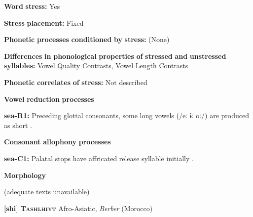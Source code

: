 \documentclass[output=paper]{langsci/langscibook}
\begin{document}
\begin{styleBody}
\textbf{Word} \textbf{stress:} Yes
\end{styleBody}

\begin{styleBody}
\textbf{Stress} \textbf{placement:} Fixed
\end{styleBody}

\begin{styleBody}
\textbf{Phonetic} \textbf{processes} \textbf{conditioned} \textbf{by} \textbf{stress:} (None)
\end{styleBody}

\begin{styleBody}
\textbf{Differences} \textbf{in} \textbf{phonological} \textbf{properties} \textbf{of} \textbf{stressed} \textbf{and} \textbf{unstressed} \textbf{syllables:} Vowel Quality Contrasts, Vowel Length Contrasts
\end{styleBody}

\begin{styleBody}
\textbf{Phonetic} \textbf{correlates} \textbf{of} \textbf{stress:} Not described
\end{styleBody}

\begin{styleBody}
\textbf{Vowel} \textbf{reduction} \textbf{processes}
\end{styleBody}

\begin{styleBody}
\textbf{sea-R1:} Preceding glottal consonants, some long vowels (/eː ɨː oː/) are produced as short \citep[10-11]{Philips2007}.
\end{styleBody}

\begin{styleBody}
\textbf{Consonant} \textbf{allophony} \textbf{processes}
\end{styleBody}

\begin{styleBody}
\textbf{sea-C1:} Palatal stops have affricated release syllable initially \citep[5]{Philips2007}.
\end{styleBody}

\begin{styleBody}
\textbf{Morphology}
\end{styleBody}

\begin{styleBody}
(adequate texts unavailable)
\end{styleBody}

\begin{styleBody}
\textbf{[shi]}   \textbf{\textsc{Tashlhiyt}}  Afro-Asiatic, \textit{Berber} (Morocco)
\end{styleBody}
\end{document}
